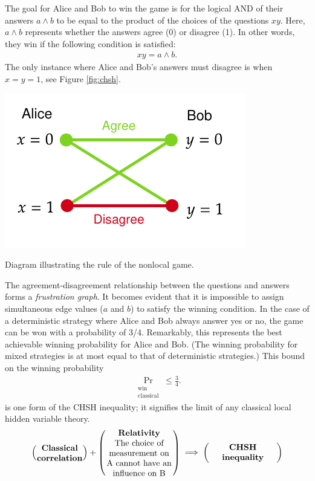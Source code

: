 \vspace{0.5em}
The goal for Alice and Bob to win the game is for the logical AND of their answers $a\wedge b$ to be equal to the product  of the choices of the questions $xy$. Here, $a\wedge b$ represents whether the answers agree (0) or disagree (1). In other words, they win if the following condition is satisfied:
\begin{align}
	xy = a\wedge b.
\end{align}
The only instance where Alice and Bob's answers must disagree is when $x=y=1$, see Figure \ref{fig:chsh}. 
\begin{marginfigure}
	\centering
	\includegraphics[scale=0.75]{fig/chsh.pdf}
	\caption{Diagram illustrating the rule of the nonlocal game.}
	\label{fig:chsh}
\end{marginfigure}
The agreement-disagreement relationship between the questions and answers forms a \emph{frustration graph}. It becomes evident that it is impossible to assign simultaneous edge values ($a$ and $b$) to satisfy the winning condition. In the case of a deterministic strategy where Alice and Bob always answer yes or no, the game can be won with a probability of 3/4. Remarkably, this represents the best achievable winning probability for Alice and Bob. (The winning probability for mixed strategies is at most equal to that of deterministic strategies.)
This bound on the winning probability
\begin{align}
	\Pr_{\substack{\textrm{win}\\ \textrm{classical}}} \le \frac{3}{4}.
\end{align}
is one form of the CHSH inequality; it signifies the limit of any classical local hidden variable theory.
\begin{align*}
	\left(\parbox{5.5em}{\centering {\bf Classical correlation} }\right)
	+ \left(\parbox{8em}{\centering {\bf Relativity} \\ The choice of measurement on A cannot have an influence on B}\right)
	\implies 
	\left(\parbox{8em}{\centering {\bf CHSH inequality}}\right)
\end{align*}

